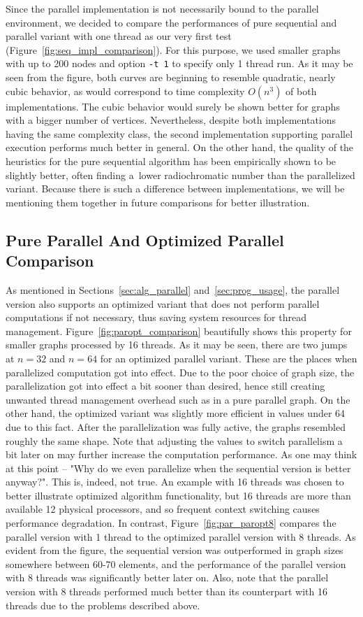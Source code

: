 \documentclass[11pt,a4paper]{article}
\begin{document}
Since the parallel implementation is not necessarily bound to the parallel environment, we decided to compare the performances of pure sequential and parallel variant with one thread as our very first test (Figure~\ref{fig:seq_impl_comparison}). For this purpose, we used smaller graphs with up to 200 nodes and option \texttt{-t 1} to specify only 1 thread run. As it may be seen from the figure, both curves are beginning to resemble quadratic, nearly cubic behavior, as would correspond to time complexity $O(n^3)$ of both implementations. The cubic behavior would surely be shown better for graphs with a bigger number of vertices. Nevertheless, despite both implementations having the same complexity class, the second implementation supporting parallel execution performs much better in general. On the other hand, the quality of the heuristics for the pure sequential algorithm has been empirically shown to be slightly better, often finding a~lower radiochromatic number than the parallelized variant. Because there is such a difference between implementations, we will be mentioning them together in future comparisons for better illustration.

\subsection{Pure Parallel And Optimized Parallel Comparison}
\label{ssec:par_paropt}

As mentioned in Sections~\ref{sec:alg_parallel} and~\ref{sec:prog_usage}, the parallel version also supports an optimized variant that does not perform parallel computations if not necessary, thus saving system resources for thread management. Figure~\ref{fig:paropt_comparison} beautifully shows this property for smaller graphs processed by 16 threads. As it may be seen, there are two jumps at $n=32$ and $n=64$ for an optimized parallel variant. These are the places when parallelized computation got into effect. Due to the poor choice of graph size, the parallelization got into effect a bit sooner than desired, hence still creating unwanted thread management overhead such as in a pure parallel graph. On the other hand, the optimized variant was slightly more efficient in values under 64 due to this fact. After the parallelization was fully active, the graphs resembled roughly the same shape. Note that adjusting the values to switch parallelism a bit later on may further increase the computation performance. As one may think at this point -- "Why do we even parallelize when the sequential version is better anyway?". This is, indeed, not true. An example with 16 threads was chosen to better illustrate optimized algorithm functionality, but 16 threads are more than available 12 physical processors,  and so frequent context switching causes performance degradation. In contrast, Figure~\ref{fig:par_paropt8} compares the parallel version with 1 thread to the optimized parallel version with 8 threads. As evident from the figure, the sequential version was outperformed in graph sizes somewhere between 60-70 elements, and the performance of the parallel version with 8 threads was significantly better later on. Also, note that the parallel version with 8 threads performed much better than its counterpart with 16 threads due to the problems described above.
\end{document}
